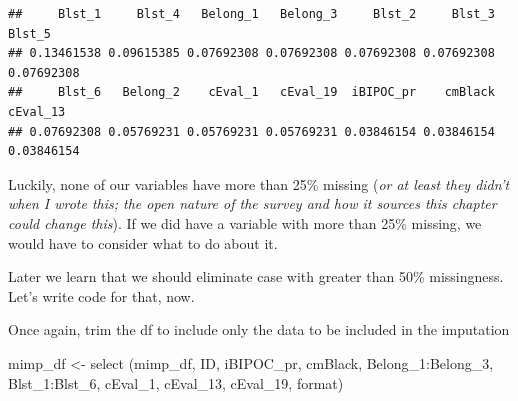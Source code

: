 \documentclass[
]{book}
\newenvironment{Shaded}{\begin{snugshade}}{\end{snugshade}}
\newcommand{\AttributeTok}[1]{\textcolor[rgb]{0.77,0.63,0.00}{#1}}
\newcommand{\CommentTok}[1]{\textcolor[rgb]{0.56,0.35,0.01}{\textit{#1}}}
\newcommand{\DecValTok}[1]{\textcolor[rgb]{0.00,0.00,0.81}{#1}}
\newcommand{\FunctionTok}[1]{\textcolor[rgb]{0.00,0.00,0.00}{#1}}
\newcommand{\NormalTok}[1]{#1}
\newcommand{\OtherTok}[1]{\textcolor[rgb]{0.56,0.35,0.01}{#1}}
\newcommand{\SpecialCharTok}[1]{\textcolor[rgb]{0.00,0.00,0.00}{#1}}
\begin{document}
\begin{verbatim}
##     Blst_1     Blst_4   Belong_1   Belong_3     Blst_2     Blst_3     Blst_5 
## 0.13461538 0.09615385 0.07692308 0.07692308 0.07692308 0.07692308 0.07692308 
##     Blst_6   Belong_2    cEval_1   cEval_19  iBIPOC_pr    cmBlack   cEval_13 
## 0.07692308 0.05769231 0.05769231 0.05769231 0.03846154 0.03846154 0.03846154
\end{verbatim}

Luckily, none of our variables have more than 25\% missing (\emph{or at least they didn't when I wrote this; the open nature of the survey and how it sources this chapter could change this}). If we did have a variable with more than 25\% missing, we would have to consider what to do about it.

Later we learn that we should eliminate case with greater than 50\% missingness. Let's write code for that, now.

\begin{Shaded}
\end{Shaded}

Once again, trim the df to include only the data to be included in the imputation

\begin{Shaded}
\begin{Highlighting}[]
\NormalTok{mimp\_df }\OtherTok{\textless{}{-}}  \FunctionTok{select}\NormalTok{ (mimp\_df, ID, iBIPOC\_pr, cmBlack, Belong\_1}\SpecialCharTok{:}\NormalTok{Belong\_3, Blst\_1}\SpecialCharTok{:}\NormalTok{Blst\_6, cEval\_1, cEval\_13, cEval\_19, format)}
\end{Highlighting}
\end{Shaded}
\end{document}
